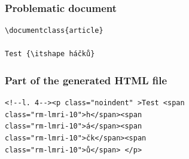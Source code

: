 




\begin{frame}[fragile]

\frametitle{Problematic document}
\begin{priklad}
\begin{verbatim}
\documentclass{article}

Test {\itshape háčků}

\end{verbatim}
\end{priklad}
\end{frame}

\begin{frame}[fragile]
  \frametitle{Part of the generated HTML file}
\begin{priklad}
\begin{verbatim}
<!--l. 4--><p class="noindent" >Test <span 
class="rm-lmri-10">h</span><span 
class="rm-lmri-10">á</span><span 
class="rm-lmri-10">čk</span><span 
class="rm-lmri-10">ů</span> </p> 
\end{verbatim}
\end{priklad}

\end{frame}


